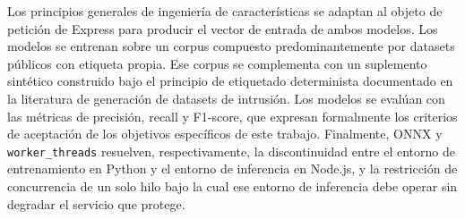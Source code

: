 Los principios generales de ingeniería de características se adaptan al objeto de petición de Express para producir el vector de entrada de ambos modelos. Los modelos se entrenan sobre un corpus compuesto predominantemente por datasets públicos con etiqueta propia. Ese corpus se complementa con un suplemento sintético construido bajo el principio de etiquetado determinista documentado en la literatura de generación de datasets de intrusión. Los modelos se evalúan con las métricas de precisión, recall y F1-score, que expresan formalmente los criterios de aceptación de los objetivos específicos de este trabajo. Finalmente, ONNX y \texttt{worker\_threads} resuelven, respectivamente, la discontinuidad entre el entorno de entrenamiento en Python y el entorno de inferencia en Node.js, y la restricción de concurrencia de un solo hilo bajo la cual ese entorno de inferencia debe operar sin degradar el servicio que protege.
